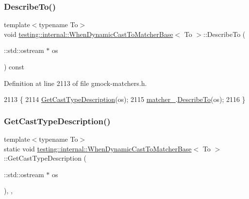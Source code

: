 \subsubsection{\texorpdfstring{Describe\+To()}{DescribeTo()}}
{\footnotesize\ttfamily template$<$typename To$>$ \\
void \hyperlink{classtesting_1_1internal_1_1WhenDynamicCastToMatcherBase}{testing\+::internal\+::\+When\+Dynamic\+Cast\+To\+Matcher\+Base}$<$ To $>$\+::Describe\+To (\begin{DoxyParamCaption}\item[{\+::std\+::ostream $\ast$}]{os }\end{DoxyParamCaption}) const\hspace{0.3cm}{\ttfamily [inline]}}



Definition at line 2113 of file gmock-\/matchers.\+h.


\begin{DoxyCode}
2113                                         \{
2114     \hyperlink{classtesting_1_1internal_1_1WhenDynamicCastToMatcherBase_ab3e9a533b6904da05dd7b96703689782}{GetCastTypeDescription}(os);
2115     \hyperlink{classtesting_1_1internal_1_1WhenDynamicCastToMatcherBase_a40d697407c960bee8fe3b125f5ac8730}{matcher\_}.\hyperlink{classtesting_1_1internal_1_1MatcherBase_a7e0c883c7745e0d646463077ef1c1267}{DescribeTo}(os);
2116   \}
\end{DoxyCode}
\mbox{\label{classtesting_1_1internal_1_1WhenDynamicCastToMatcherBase_ab3e9a533b6904da05dd7b96703689782}} 
\subsubsection{\texorpdfstring{Get\+Cast\+Type\+Description()}{GetCastTypeDescription()}}
{\footnotesize\ttfamily template$<$typename To$>$ \\
static void \hyperlink{classtesting_1_1internal_1_1WhenDynamicCastToMatcherBase}{testing\+::internal\+::\+When\+Dynamic\+Cast\+To\+Matcher\+Base}$<$ To $>$\+::Get\+Cast\+Type\+Description (\begin{DoxyParamCaption}\item[{\+::std\+::ostream $\ast$}]{os }\end{DoxyParamCaption})\hspace{0.3cm}{\ttfamily [inline]}, {\ttfamily [static]}, {\ttfamily [private]}}



